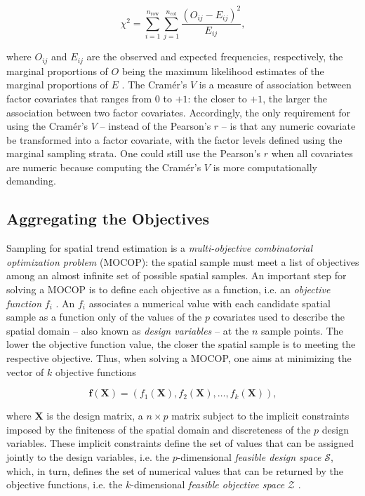\begin{equation}\label{eqn:chap08-chi-squared} %
 \chi^2 = \sum_{i = 1}^{n_\text{row}}\sum_{j=1}^{n_\text{col}}\frac{(O_{ij} - E_{ij})^2}{E_{ij}},
\end{equation}

\noindent where $O_{ij}$ and $E_{ij}$ are the observed and expected frequencies, respectively, the marginal 
proportions of $O$ being the maximum likelihood estimates of the marginal proportions of $E$ 
\cite{Cramer1946, Agresti2002}. The Cramér's $V$ is a measure of association between factor covariates that 
ranges from $0$ to $+1$: the closer to $+1$, the larger the association between two factor covariates. 
Accordingly, the only requirement for using the Cramér's $V$ -- instead of the Pearson's $r$ -- is that any 
numeric covariate be transformed into a factor covariate, with the factor levels defined using the marginal 
sampling strata. One could still use the Pearson's $r$ when all covariates are numeric because computing the 
Cramér's $V$ is more computationally demanding.

\subsection{Aggregating the Objectives}

Sampling for spatial trend estimation is a \emph{multi-objective combinatorial optimization problem} (MOCOP): 
the spatial sample must meet a list of objectives among an almost infinite set of possible spatial samples. An 
important step for solving a MOCOP is to define each objective as a function, i.e. an \emph{objective function} 
$f_i$ \cite{Arora2011}. An $f_i$ associates a numerical value with each candidate spatial sample as a function 
only of the values of the $p$ covariates used to describe the spatial domain -- also known as \emph{design 
variables} \cite{Arora2011} -- at the $n$ sample points. The lower the objective function value, the closer the 
spatial sample is to meeting the respective objective. Thus, when solving a MOCOP, one aims at minimizing the 
vector of $k$ objective functions \cite{Arora2011}

\begin{equation}\label{eqn:chap08-mocop} %
 \boldsymbol{f}(\boldsymbol{X}) = (f_1(\boldsymbol{X}), f_2(\boldsymbol{X}), \ldots, f_k(\boldsymbol{X})),
\end{equation}\label{eqn:chap08-mocop}

\noindent where $\boldsymbol{X}$ is the design matrix, a $n \times p$ matrix subject to the implicit 
constraints imposed by the finiteness of the spatial domain and discreteness of the $p$ design variables. 
These implicit constraints define the set of values that can be assigned jointly to the design variables, i.e. 
the $p$-dimensional \emph{feasible design space} $\mathcal{S}$, which, in turn, defines the set of numerical 
values that can be returned by the objective functions, i.e. the $k$-dimensional \emph{feasible objective 
space} $\mathcal{Z}$ \cite{MarlerEtAl2004}.

